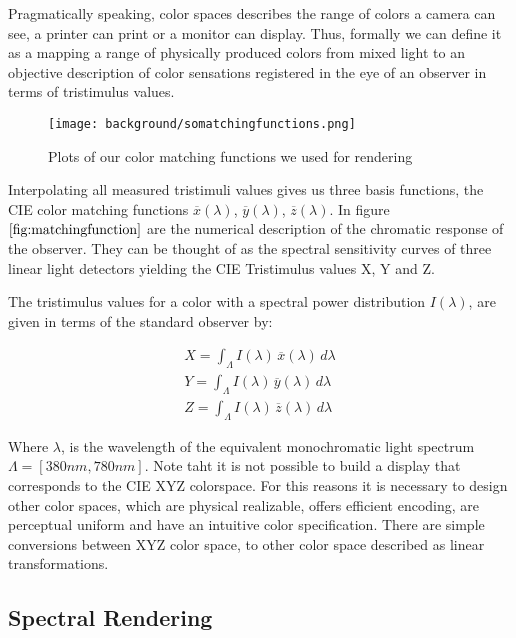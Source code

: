 Pragmatically speaking, color spaces describes the range of colors a camera can see, a printer can print or a monitor can display. Thus, formally we can define it as a mapping a range of physically produced colors from mixed light to an objective description of color
sensations registered in the eye of an observer in terms of tristimulus values. 

\begin{figure}[H]
  \centering
  \texttt{[image: background/somatchingfunctions.png]}
  \caption{Plots of our color matching functions we used for rendering}
  \label{fig:matchingfunction}
\end{figure}

Interpolating all measured tristimuli values gives us three basis functions, the CIE color matching functions $\overline{x}(\lambda)$, $\overline{y}(\lambda)$, $\overline{z}(\lambda)$. In figure $\ref{fig:matchingfunction}$ are the numerical description of the chromatic response of the observer. They can be thought of as the spectral sensitivity curves of three linear light detectors yielding the CIE Tristimulus values X, Y and Z. 

The tristimulus values for a color with a spectral power distribution $I(\lambda)$, are given in terms of the standard observer by:

\begin{align}
    X= \int_{\Lambda} I(\lambda)\,\overline{x}(\lambda)\,d\lambda \nonumber \\
    Y= \int_{\Lambda} I(\lambda)\,\overline{y}(\lambda)\,d\lambda \nonumber \\
    Z= \int_{\Lambda} I(\lambda)\,\overline{z}(\lambda)\,d\lambda
\label{eq:tristimulusvalues}
\end{align}

Where $\lambda$, is the wavelength of the equivalent monochromatic light spectrum $\Lambda = [380nm, 780nm]$. Note taht it is not possible to build a display that corresponds to the CIE XYZ colorspace. For this reasons it is necessary to design other color spaces, which are physical realizable, offers efficient encoding, are perceptual uniform and have an intuitive color specification. There are simple conversions between XYZ color space, to other color space described as linear transformations.

\subsection{Spectral Rendering}



